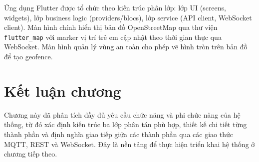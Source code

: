 \documentclass[../DoAn.tex]{subfiles}
\begin{document}
Ứng dụng Flutter được tổ chức theo kiến trúc phân lớp: lớp UI (screens, widgets), lớp business logic (providers/blocs), lớp service (API client, WebSocket client). Màn hình chính hiển thị bản đồ OpenStreetMap qua thư viện \texttt{flutter\_map} với marker vị trí trẻ em cập nhật theo thời gian thực qua WebSocket. Màn hình quản lý vùng an toàn cho phép vẽ hình tròn trên bản đồ để tạo geofence.

\section{Kết luận chương}

Chương này đã phân tích đầy đủ yêu cầu chức năng và phi chức năng của hệ thống, từ đó xác định kiến trúc ba lớp phân tán phù hợp, thiết kế chi tiết từng thành phần và định nghĩa giao tiếp giữa các thành phần qua các giao thức MQTT, REST và WebSocket. Đây là nền tảng để thực hiện triển khai hệ thống ở chương tiếp theo.
\end{document}
